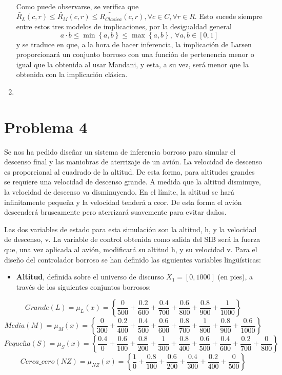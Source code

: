 \documentclass[
]{article}
\providecommand{\tightlist}{%
  \setlength{\itemsep}{0pt}\setlength{\parskip}{0pt}}
\begin{document}
\begin{enumerate}
\[\begin{array}{cccccc}
  \end{array}\] Como puede observarse, se verifica que
  \(\widetilde{R_{L}}\left(c,r\right)\leq\widetilde{R_{M}}\left(c,r\right)\leq\widetilde{R_{Clasica}}\left(c,r\right),\forall c\in C,\forall r\in R\).
  Esto sucede siempre entre estos tres modelos de implicaciones, por la
  desigualdad general
  \[a\cdot b\leq\min\left\{ a,b\right\} \leq\max\left\{ a,b\right\} ,\ \forall a,b\in\left[0,1\right]\]
  y se traduce en que, a la hora de hacer inferencia, la implicación de
  Larsen proporcionará un conjunto borroso con una función de
  pertenencia menor o igual que la obtenida al usar Mandani, y esta, a
  su vez, será menor que la obtenida con la implicación clásica.
\item
\end{enumerate}

\newpage

\hypertarget{problema-4}{%
\section{Problema 4}\label{problema-4}}

Se nos ha pedido diseñar un sistema de inferencia borroso para simular
el descenso final y las maniobras de aterrizaje de un avión. La
velocidad de descenso es proporcional al cuadrado de la altitud. De esta
forma, para altitudes grandes se requiere una velocidad de descenso
grande. A medida que la altitud disminuye, la velocidad de descenso va
disminuyendo. En el límite, la altitud se hará infinitamente pequeña y
la velocidad tenderá a ceor. De esta forma el avión descenderá
bruscamente pero aterrizará suavemente para evitar daños.

Las dos variables de estado para esta simulación son la altitud, h, y la
velocidad de descenso, v. La variable de control obtenida como salida
del SIB será la fuerza que, una vez aplicada al avión, modificará su
altitud h, y su velocidad v. Para el diseño del controlador borroso se
han definido las siguientes variables lingüísticas:

\begin{itemize}
\tightlist
\item
  \textbf{Altitud}, definida sobre el universo de discurso
  \(X_{1}=\left[0,1000\right]\) (en pies), a través de los siguientes
  conjuntos borrosos:
\end{itemize}

\[Grande\left(L\right)=\mu_{L}\left(x\right)=\left\{ \frac{0}{500}+\frac{0.2}{600}+\frac{0.4}{700}+\frac{0.6}{800}+\frac{0.8}{900}+\frac{1}{1000}\right\} \]
\[Media\left(M\right)=\mu_{M}\left(x\right)=\left\{ \frac{0}{300}+\frac{0.2}{400}+\frac{0.4}{500}+\frac{0.6}{600}+\frac{0.8}{700}+\frac{1}{800}+\frac{0.8}{900}+\frac{0.6}{1000}\right\} \]
\[Pequeña\left(S\right)=\mu_{S}\left(x\right)=\left\{ \frac{0.4}{0}+\frac{0.6}{100}+\frac{0.8}{200}+\frac{1}{300}+\frac{0.8}{400}+\frac{0.6}{500}+\frac{0.4}{600}+\frac{0.2}{700}+\frac{0}{800}\right\} \]
\[Cerca\_cero\left(NZ\right)=\mu_{NZ}\left(x\right)=\left\{ \frac{1}{0}+\frac{0.8}{100}+\frac{0.6}{200}+\frac{0.4}{300}+\frac{0.2}{400}+\frac{0}{500}\right\} \]
\end{document}
